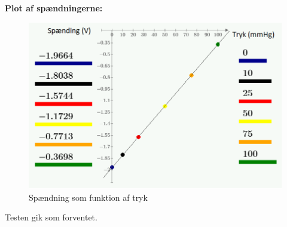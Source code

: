 \vspace{0.2 cm}

\textbf{Plot af spændningerne:}

\vspace{0.2 cm}

\begin{figure}[h!]
	\centering
	\includegraphics[width=1\linewidth]{Hardwaredesign/trykgraf}
	\caption{Spændning som funktion af tryk}
	\label{fig:trykgraf}
\end{figure}

Testen gik som forventet.


